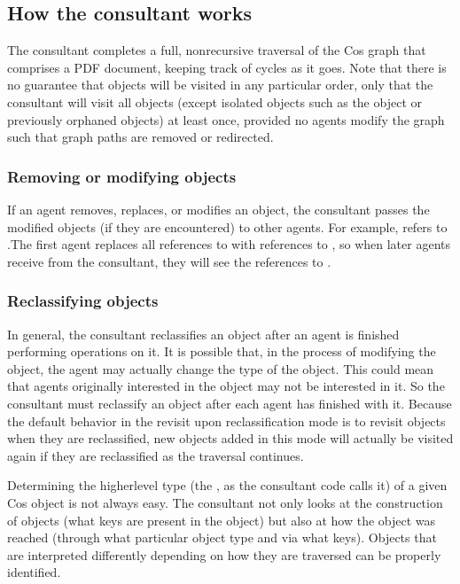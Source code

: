 \documentclass[letterpaper,12pt,english,openany,oneside]{sphinxmanual}
\begin{document}
\subsection{How the consultant works}
\label{\detokenize{Plugins_ExtendedAPI:how-the-consultant-works}}
The consultant completes a full, non\sphinxhyphen{}recursive traversal of the Cos graph that comprises a PDF document, keeping track of cycles as it goes. Note that there is no guarantee that objects will be visited in any particular order, only that the consultant will visit all objects (except isolated objects such as the  object or previously orphaned objects) at least once, provided no agents modify the graph such that graph paths are removed or redirected.


\subsubsection{Removing or modifying objects}
\label{\detokenize{Plugins_ExtendedAPI:removing-or-modifying-objects}}
If an agent removes, replaces, or modifies an object, the consultant passes the modified objects (if they are encountered) to other agents. For example,  refers to .The first agent replaces all references to  with references to , so when later agents receive  from the consultant, they will see the references to .


\subsubsection{Reclassifying objects}
\label{\detokenize{Plugins_ExtendedAPI:reclassifying-objects}}
In general, the consultant reclassifies an object after an agent is finished performing operations on it. It is possible that, in the process of modifying the object, the agent may actually change the type of the object. This could mean that agents originally interested in the object may not be interested in it. So the consultant must reclassify an object after each agent has finished with it. Because the default behavior in the revisit upon reclassification mode is to revisit objects when they are reclassified, new objects added in this mode will actually be visited again if they are reclassified as the traversal continues.

Determining the higher\sphinxhyphen{}level type (the , as the consultant code calls it) of a given Cos object is not always easy. The consultant not only looks at the construction of objects (what keys are present in the object) but also at how the object was reached (through what particular object type and via what keys). Objects that are interpreted differently depending on how they are traversed can be properly identified.
\end{document}
